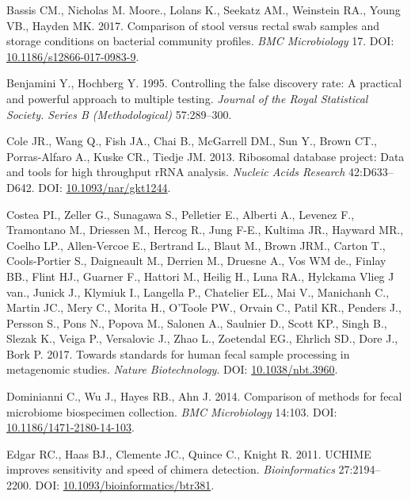 \documentclass[12pt,]{article}
\begin{document}
\hypertarget{refs}{}
\hypertarget{ref-storage_Bassis_2017}{}
Bassis CM., Nicholas M. Moore., Lolans K., Seekatz AM., Weinstein RA.,
Young VB., Hayden MK. 2017. Comparison of stool versus rectal swab
samples and storage conditions on bacterial community profiles.
\emph{BMC Microbiology} 17. DOI:
\href{https://doi.org/10.1186/s12866-017-0983-9}{10.1186/s12866-017-0983-9}.

\hypertarget{ref-benjamini_controlling_1995}{}
Benjamini Y., Hochberg Y. 1995. Controlling the false discovery rate: A
practical and powerful approach to multiple testing. \emph{Journal of
the Royal Statistical Society. Series B (Methodological)} 57:289--300.

\hypertarget{ref-rdp_Cole_2013}{}
Cole JR., Wang Q., Fish JA., Chai B., McGarrell DM., Sun Y., Brown CT.,
Porras-Alfaro A., Kuske CR., Tiedje JM. 2013. Ribosomal database
project: Data and tools for high throughput rRNA analysis. \emph{Nucleic
Acids Research} 42:D633--D642. DOI:
\href{https://doi.org/10.1093/nar/gkt1244}{10.1093/nar/gkt1244}.

\hypertarget{ref-metagenomcis_bias_Costea_2017}{}
Costea PI., Zeller G., Sunagawa S., Pelletier E., Alberti A., Levenez
F., Tramontano M., Driessen M., Hercog R., Jung F-E., Kultima JR.,
Hayward MR., Coelho LP., Allen-Vercoe E., Bertrand L., Blaut M., Brown
JRM., Carton T., Cools-Portier S., Daigneault M., Derrien M., Druesne
A., Vos WM de., Finlay BB., Flint HJ., Guarner F., Hattori M., Heilig
H., Luna RA., Hylckama Vlieg J van., Junick J., Klymiuk I., Langella P.,
Chatelier EL., Mai V., Manichanh C., Martin JC., Mery C., Morita H.,
O'Toole PW., Orvain C., Patil KR., Penders J., Persson S., Pons N.,
Popova M., Salonen A., Saulnier D., Scott KP., Singh B., Slezak K.,
Veiga P., Versalovic J., Zhao L., Zoetendal EG., Ehrlich SD., Dore J.,
Bork P. 2017. Towards standards for human fecal sample processing in
metagenomic studies. \emph{Nature Biotechnology}. DOI:
\href{https://doi.org/10.1038/nbt.3960}{10.1038/nbt.3960}.

\hypertarget{ref-preservation_Dominianni_2014}{}
Dominianni C., Wu J., Hayes RB., Ahn J. 2014. Comparison of methods for
fecal microbiome biospecimen collection. \emph{BMC Microbiology} 14:103.
DOI:
\href{https://doi.org/10.1186/1471-2180-14-103}{10.1186/1471-2180-14-103}.

\hypertarget{ref-uchime_Edgar_2011}{}
Edgar RC., Haas BJ., Clemente JC., Quince C., Knight R. 2011. UCHIME
improves sensitivity and speed of chimera detection.
\emph{Bioinformatics} 27:2194--2200. DOI:
\href{https://doi.org/10.1093/bioinformatics/btr381}{10.1093/bioinformatics/btr381}.
\end{document}

